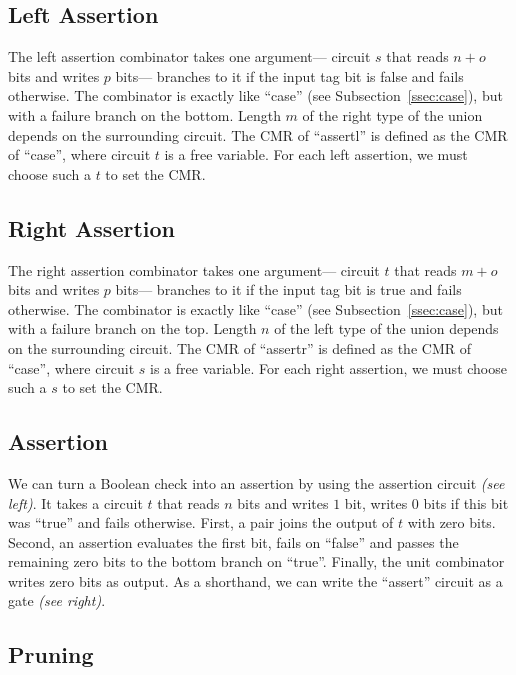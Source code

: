 \subsection{Left Assertion}


%
The left assertion combinator takes one argument---%
circuit $s$ that reads $n + o$ bits and writes $p$ bits---%
branches to it if the input tag bit is false
and fails otherwise.
The combinator is exactly like \enquote{case} (see Subsection~\ref{ssec:case}),
but with a failure branch on the bottom.
%
Length $m$ of the right type of the union depends on the surrounding circuit.
%
The CMR of \enquote{assertl} is defined as the CMR of \enquote{case},
where circuit $t$ is a free variable.
For each left assertion,
we must choose such a $t$ to set the CMR.

\subsection{Right Assertion}


%
The right assertion combinator takes one argument---%
circuit $t$ that reads $m + o$ bits and writes $p$ bits---%
branches to it if the input tag bit is true
and fails otherwise.
The combinator is exactly like \enquote{case} (see Subsection~\ref{ssec:case}),
but with a failure branch on the top.
%
Length $n$ of the left type of the union depends on the surrounding circuit.
%
The CMR of \enquote{assertr} is defined as the CMR of \enquote{case},
where circuit $s$ is a free variable.
For each right assertion,
we must choose such a $s$ to set the CMR.

\subsection{Assertion}


%
We can turn a Boolean check into an assertion by using the assertion circuit \emph{(see left)}.
It takes a circuit $t$ that reads $n$ bits and writes $1$ bit,
writes 0 bits if this bit was \enquote{true} and fails otherwise.
%
First,
a pair joins the output of $t$ with zero bits.
Second,
an assertion evaluates the first bit,
fails on \enquote{false}
and passes the remaining zero bits to the bottom branch on \enquote{true}.
Finally,
the unit combinator writes zero bits as output.
%
As a shorthand,
we can write the \enquote{assert} circuit as a gate \emph{(see right)}.

\subsection{Pruning}

